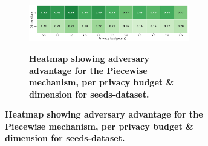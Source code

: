 \begin{figure}[H]
\begin{subfigure}[b]{0.85\textwidth}
        \begin{subfigure}[c]{1\textwidth}
            \caption{\textbf{Heatmap showing adversary advantage for the Piecewise mechanism, per privacy budget \& dimension for seeds-dataset.}}
            \includegraphics[width=1\textwidth]{Results/kd-laplace/piecewise/circle-dataset/shokri_mi_adv.png}
            \label{fig:privacy_circle-dataset_adversial_advantage_piecewise}
        \end{subfigure}
    \end{subfigure}
    \hfill %
    \begin{subfigure}[b]{0.075\textwidth}

\end{subfigure}
\end{figure}
